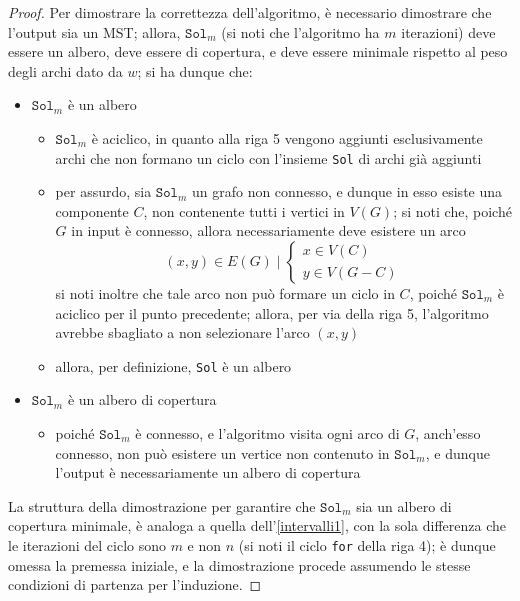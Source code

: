 \documentclass[a4paper, 12pt]{report}
\begin{document}
    \begin{proof}
        Per dimostrare la correttezza dell'algoritmo, è necessario dimostrare che l'output sia un MST; allora, $\texttt{Sol}_m$ (si noti che l'algoritmo ha $m$ iterazioni) deve essere un albero, deve essere di copertura, e deve essere minimale rispetto al peso degli archi dato da $w$; si ha dunque che:

        \begin{itemize}
            \item $\texttt{Sol}_m$ è un albero
                \begin{itemize}
                    \item $\texttt{Sol}_m$ è aciclico, in quanto alla riga 5 vengono aggiunti esclusivamente archi che non formano un ciclo con l'insieme \texttt{Sol} di archi già aggiunti
                    \item per assurdo, sia $\texttt{Sol}_m$ un grafo non connesso, e dunque in esso esiste una componente $C$, non contenente tutti i vertici in $V(G)$; si noti che, poiché $G$ in input è connesso, allora necessariamente deve esistere un arco $$(x, y) \in E(G) \mid \left \{ \begin{array}{l} x \in V(C) \\ y \in V(G - C) \end{array} \right.$$ si noti inoltre che tale arco non può formare un ciclo in $C$, poiché $\texttt{Sol}_m$ è aciclico per il punto precedente; allora, per via della riga 5, l'algoritmo avrebbe sbagliato a non selezionare l'arco $(x, y)$
                    \item allora, per definizione, \texttt{Sol} è un albero
                \end{itemize}
            \item $\texttt{Sol}_m$ è un albero di copertura
                \begin{itemize}
                    \item poiché $\texttt{Sol}_m$ è connesso, e l'algoritmo visita ogni arco di $G$, anch'esso connesso, non può esistere un vertice non contenuto in $\texttt{Sol}_m$, e dunque l'output è necessariamente un albero di copertura
                \end{itemize}
        \end{itemize}

        La struttura della dimostrazione per garantire che $\texttt{Sol}_m$ sia un albero di copertura minimale, è analoga a quella dell'\cref{intervalli1}, con la sola differenza che le iterazioni del ciclo sono $m$ e non $n$ (si noti il ciclo \texttt{for} della riga 4); è dunque omessa la premessa iniziale, e la dimostrazione procede assumendo le stesse condizioni di partenza per l'induzione.


\end{proof}
\end{document}
